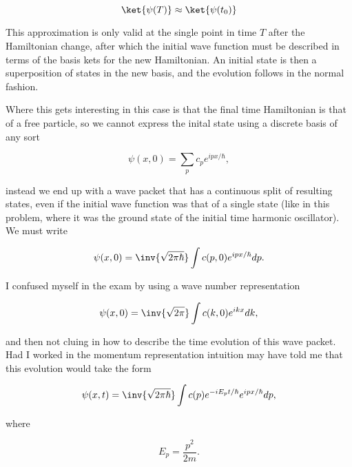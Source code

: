 \begin{equation}\label{eqn:qmTwoExamReflection:50}
\ket{\psi(T)} \approx \ket{\psi(t_0)}
\end{equation}

This approximation is only valid at the single point in time $T$ after the Hamiltonian change, after which the initial wave function must be described in terms of the basis kets for the new Hamiltonian.  An initial state is then a superposition of states in the new basis, and the evolution follows in the normal fashion.

Where this gets interesting in this case is that the final time Hamiltonian is that of a free particle, so we cannot express the inital state using a discrete basis of any sort

\begin{equation}\label{eqn:qmTwoExamReflection:70}
\psi(x, 0) = \sum_p c_p e^{i p x/\hbar},
\end{equation}

instead we end up with a wave packet that has a continuous split of resulting states, even if the initial wave function was that of a single state (like in this problem, where it was the ground state of the initial time harmonic oscillator).  We must write

\begin{equation}\label{eqn:qmTwoExamReflection:90}
\psi(x, 0) = \inv{\sqrt{2 \pi \hbar}} \int c(p, 0) e^{i p x/\hbar} dp.
\end{equation}

I confused myself in the exam by using a wave number representation

\begin{equation}\label{eqn:qmTwoExamReflection:110}
\psi(x, 0) = \inv{\sqrt{2 \pi}} \int c(k, 0) e^{i k x} dk,
\end{equation}

and then not cluing in how to describe the time evolution of this wave packet.  Had I worked in the momentum representation intuition may have told me that this evolution would take the form

\begin{equation}\label{eqn:qmTwoExamReflection:130}
\psi(x, t) = \inv{\sqrt{2 \pi \hbar}} \int c(p) e^{- i E_p t/\hbar} e^{i p x/\hbar} dp,
\end{equation}

where

\begin{equation}\label{eqn:qmTwoExamReflection:150}
E_p = \frac{p^2}{2m}.
\end{equation}

